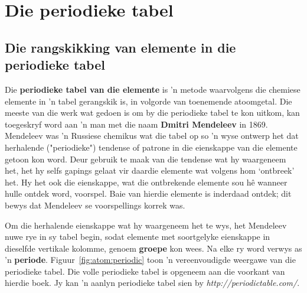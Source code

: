          \chapter{Die periodieke tabel}
 \label{m38760*cid9}
            \section{Die rangskikking van elemente in die periodieke tabel}
            \nopagebreak

      \label{m38760*id261491}Die \textbf{periodieke tabel van die elemente} is 'n metode waarvolgens die chemiese elemente in 'n tabel gerangskik is,
in volgorde van toenemende atoomgetal. Die meeste van die werk wat gedoen is om by die periodieke tabel te kon uitkom, kan toegeskryf word aan 'n man met die naam \textbf{Dmitri Mendeleev} in 1869. Mendeleev was 'n Russiese chemikus wat die tabel op so 'n wyse ontwerp het dat herhalende ("periodieke") tendense of patrone in die eienskappe van die elemente getoon kon word. Deur gebruik te maak van die tendense wat hy waargeneem het, het hy selfs gapings gelaat vir daardie elemente wat volgens hom ‘ontbreek’ het. Hy het ook die eienskappe, wat die ontbrekende elemente sou h\^{e} wanneer hulle ontdek word, voorspel. Baie van hierdie elemente is inderdaad ontdek; dit bewys dat Mendeleev se voorspellings korrek was.\par 
      \label{m38760*id261511}Om die herhalende eienskappe wat hy waargeneem het te wys, het Mendeleev nuwe rye in sy tabel begin, 
sodat elemente met soortgelyke eienskappe in dieselfde vertikale kolomme, genoem \textbf{groepe} kon wees. Na elke ry word verwys as  'n \textbf{periode}. Figuur~\ref{fig:atom:periodic} toon 'n vereenvoudigde weergawe van die periodieke tabel. Die
volle periodieke tabel is opgeneem aan die voorkant van hierdie boek. Jy kan 'n aanlyn periodieke tabel sien by \textsl{http://periodictable.com/}. \par 
    \setcounter{subfigure}{0}
